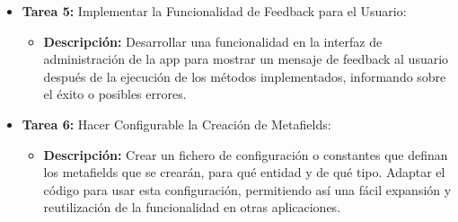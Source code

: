 \documentclass[12pt]{article}
\begin{document}
\begin{itemize}
\begin{itemize}[label=--]
          \end{itemize}
    \item \textbf{Tarea 5:} Implementar la Funcionalidad de Feedback para el Usuario:
          \begin{itemize}[label=--]
              \item \textbf{Descripción:} Desarrollar una funcionalidad en la interfaz de administración de la app para mostrar un mensaje de feedback al usuario después de la ejecución de los métodos implementados, informando sobre el éxito o posibles errores.
          \end{itemize}
    \item \textbf{Tarea 6:} Hacer Configurable la Creación de Metafields:
          \begin{itemize}[label=--]
              \item \textbf{Descripción:} Crear un fichero de configuración o constantes que definan los metafields que se crearán, para qué entidad y de qué tipo. Adaptar el código para usar esta configuración, permitiendo así una fácil expansión y reutilización de la funcionalidad en otras aplicaciones.
          \end{itemize}
\end{itemize}
\end{document}
